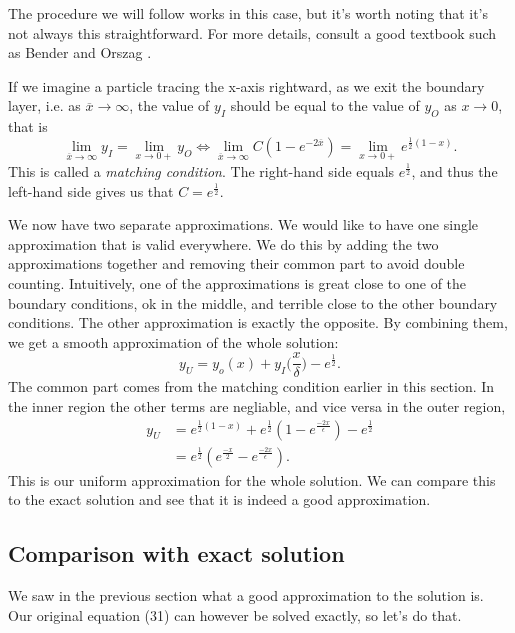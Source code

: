 \documentclass[12pt]{article}
\begin{document}
The procedure we will follow works in this case, but it's worth noting
that it's not always this straightforward. For more details, consult a
good textbook such as Bender and Orszag \cite{bender1999advanced}.

If we imagine a particle tracing the x-axis rightward, as we exit the boundary
layer, i.e. as $\overline{x} \to \infty$, the value of $y_I$ should be equal to
the value of $y_O$ as $x \to 0$, that is
\begin{equation}
\lim_{\overline{x} \to \infty} y_I = \lim_{x\to 0+} y_O \iff 
\lim_{\overline{x} \to \infty} C(1 - e^{-2\overline{x}}) = \lim_{x \to 0+} e^{\frac{1}{2}(1-x)}.
\end{equation}
This is called a \textit{matching condition}. The right-hand side equals
$e^{\frac{1}{2}}$, and thus the left-hand side gives us that $C =
e^{\frac{1}{2}}$.

We now have two separate approximations. We would like to have one
single approximation that is valid everywhere. We do this by adding
the two approximations together and removing their common part to
avoid double counting. Intuitively, one of the approximations is great
close to one of the boundary conditions, ok in the middle, and
terrible close to the other boundary conditions. The other
approximation is exactly the opposite. By combining them, we get a
smooth approximation of the whole solution:
\begin{equation}
y_U = y_o(x) + y_I\Big(\frac{x}{\delta}\Big) - e^{\frac{1}{2}}.
\end{equation}
The common part comes from the matching condition earlier in this
section. In the inner region the other terms are negliable, and vice
versa in the outer region,
\begin{align}
  y_U &= e^{\frac{1}{2}(1-x)} + e^{\frac{1}{2}}(1 - e^{\frac{-2x}{\epsilon}}) -
        e^{\frac{1}{2}} \\
      &=  e^{\frac{1}{2}}(e^{\frac{-x}{2}} - e^{\frac{-2x}{\epsilon}}).
\end{align}
This is our uniform approximation for the whole solution. We can
compare this to the exact solution and see that it is indeed a good
approximation.

\subsection{Comparison with exact solution}

We saw in the previous section what a good approximation to the
solution is. Our original equation (31) can however be solved exactly,
so let's do that.
\end{document}
